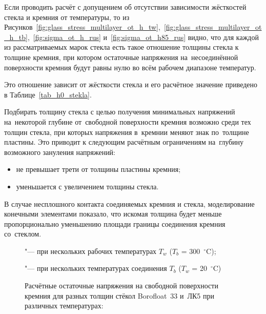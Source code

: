 Если проводить расчёт с допущением об отсутствии зависимости жёсткостей стекла и кремния  от температуры, то из Рисунков~\ref{fig:glass_stress_multilayer_ot_h_tw},~\ref{fig:glass_stress_multilayer_ot_h_tb},~\ref{fig:sigma_ot_h_rus} и~\ref{fig:sigma_ot_h85_rus} видно, что для каждой из рассматриваемых марок стекла есть такое отношение толщины стекла к толщине кремния, при котором остаточные напряжения на~несоединённой поверхности кремния будут равны нулю во всём рабочем диапазоне температур.

Это отношение зависит от жёсткости стекла и его расчётное значение приведено в Таблице~\ref{tab_h0_stekla}.

Подбирать толщину стекла с целью получения минимальных напряжений
на~некоторой глубине от~свободной поверхности кремния возможно среди
тех толщин стекла, при которых напряжения в~кремнии меняют знак
по~толщине пластины. Это приводит к следующим расчётным ограничениям
на~глубину возможного зануления напряжений:
\begin{itemize}
    \item не превышает трети от толщины пластины кремния;
    \item уменьшается с увеличением толщины стекла.
\end{itemize}%
\begingroup%
В случае
несплошного контакта соединяемых
кремния и стекла, моделирование конечными элементами показало, что
искомая толщина будет меньше пропорционально уменьшению площади
границы соединения кремния со~стеклом.\russianpar
\endgroup

\begin{figure}[!ht]%
    \centering%
    \subcaptionbox{\label{fig:glass_stress_multilayer_ot_h_tw}}
    {%
    }%
    \subcaptionbox{\label{fig:glass_stress_multilayer_ot_h_tb}}
    {%
    }%

    \caption{Расчётные остаточные напряжения на свободной поверхности кремния для разных толщин стёкол Borofloat~33 и~ЛК5 при различных температурах:}
    \textit{} "--- при нескольких
    рабочих температурах \(T_w\) (\(T_b\) = 300~${}^\circ$C);

    \textit{} "--- при нескольких
    температурах соединения \(T_b\) (\(T_w\) = 20~${}^\circ$C)
\end{figure}

